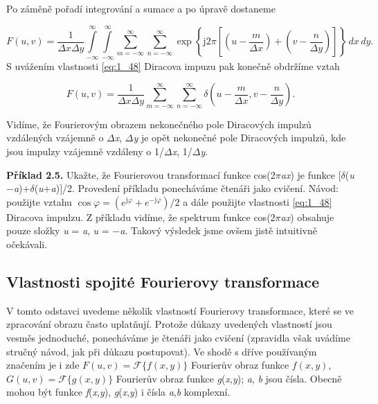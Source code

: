 \noindent Po záměně pořadí integrování a sumace a po úpravě dostaneme

\begin{equation}
    F(u, v) = \frac{1}{\Delta x \Delta y} \int\limits_{-\infty}^{\infty} \int\limits_{-\infty}^{\infty} \sum\limits_{m=-\infty}^{\infty} \sum\limits_{n=-\infty}^{\infty} \exp \left\{ \mathrm{j} 2 \pi \left[ \left( u - \frac{m}{\Delta x} \right) + \left( v - \frac{n}{\Delta y} \right) \right] \right\} \,dx\,dy.\nonumber
\end{equation}
S uvážením vlastnosti \eqref{eq:1_48} Diracova impuzu pak konečně obdržíme vztah

\begin{equation}
    F(u, v) = \frac{1}{\Delta x \Delta y} \sum\limits_{m=-\infty}^{\infty} \sum\limits_{n=-\infty}^{\infty} \delta \left( u - \frac{m}{\Delta x}, v - \frac{n}{\Delta y} \right).\nonumber
\end{equation}

\noindent Vidíme, že Fourierovým obrazem nekonečného pole Diracových impulzů vzdálených vzájemně o $\Delta$\textit{x}, $\Delta$\textit{y} je opět nekonečné pole Diracových impulzů, kde jsou impulzy vzájemně vzdáleny o 1/$\Delta$\textit{x}, 1/$\Delta$\textit{y}.

\noindent \textbf{Příklad 2.5.} Ukažte, že Fourierovou transformací funkce cos(2$\pi$\textit{ax}) je funkce $[$$\delta$(\textit{u}$-$\textit{a})+$\delta$(\textit{u}+\textit{a})$]$/2. Provedení příkladu ponecháváme čtenáři jako cvičení. Návod: použijte vztahu $\cos \varphi = (e^{\mathrm{j}\varphi} + e^{-\mathrm{j}\varphi})/2$ a dále použijte vlastnosti \eqref{eq:1_48} Diracova impulzu. Z příkladu vidíme, že spektrum funkce cos(2$\pi$\textit{ax}) obsahuje pouze složky \textit{u} = \textit{a}, \textit{u} = $-$\textit{a}. Takový výsledek jsme ovšem jistě intuitivně očekávali.

\subsection*{Vlastnosti spojité Fourierovy transformace}

V tomto odstavci uvedeme několik vlastností Fourierovy transformace, které se ve zpracování obrazu často uplatňují. Protože důkazy uvedených vlastností jsou vesměs jednoduché, ponecháváme je čtenáři jako cvičení (zpravidla však uvádíme stručný návod, jak při důkazu postupovat). Ve shodě s dříve používaným značením je i zde $F(u, v) = \mathscr{F}\{f(x, y)\}$ Fourierův obraz funkce $f(x, y)$, $G(u, v) = \mathscr{F}\{g(x, y)\}$ Fourierův obraz funkce \textit{g}(\textit{x},\textit{y}); \textit{a}, \textit{b} jsou čísla. Obecně mohou být funkce \textit{f}(\textit{x},\textit{y}), \textit{g}(\textit{x},\textit{y}) i čísla \textit{a},\textit{b} komplexní.

